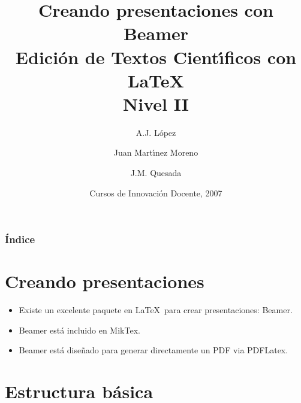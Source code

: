 \documentclass[11pt]{beamer}
\title[Beamer]{ Creando
presentaciones con Beamer\\Edici\'{o}n de Textos Cient\'{\i}ficos
con \LaTeX\\Nivel II}
\author[L\'opez-Mart\'inez-Quesada]{A.J. L\'{o}pez  \and Juan Mart\'{\i}nez Moreno \and
J.M. Quesada }
\institute[Ja\'{e}n] %
{
  Universidad de Ja\'{e}n\\
  Departamento de Matem\'{a}ticas
}
\date[Innovaci\'{o}n Docente, 2007] %
{Cursos de Innovaci\'{o}n Docente, 2007}
\begin{document}



\begin{frame}
  \titlepage
\end{frame}

\begin{frame}
  \frametitle{\'{I}ndice}
  \tableofcontents[pausesections]
\end{frame}



\section{Creando presentaciones}

\begin{frame}

\begin{itemize}
\item Existe un excelente paquete en \LaTeX ~para crear presentaciones: \alert{Beamer}.

\item Beamer est\'a incluido en MikTex.

\item Beamer est\'a dise\~nado para generar directamente un PDF via
PDFLatex.

\end{itemize}

\end{frame}

\section{Estructura b\'asica}
\end{document}

